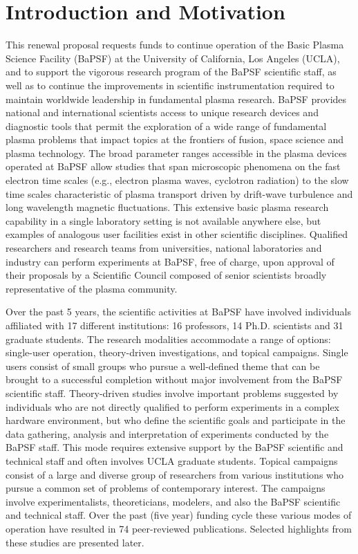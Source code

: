 \documentclass[11pt]{article}
\date{}
\title{}
\begin{document}
\section{Introduction and Motivation}

This renewal proposal requests funds to continue operation of the Basic
Plasma Science Facility (BaPSF) at the University of California, Los
Angeles (UCLA), and to support the vigorous research program of the
BaPSF scientific staff, as well as to continue the improvements in
scientific instrumentation required to maintain worldwide leadership in
fundamental plasma research.  BaPSF provides national and international scientists access to unique
research devices and diagnostic tools that permit the exploration of a
wide range of fundamental plasma problems that impact topics at the
frontiers of fusion, space science and plasma technology. The broad
parameter ranges accessible in the plasma devices operated at BaPSF
allow studies that span microscopic phenomena on the fast electron time
scales (e.g., electron plasma waves, cyclotron radiation) to the slow
time scales characteristic of plasma transport driven by drift-wave
turbulence and long wavelength magnetic fluctuations. This extensive
basic plasma research capability in a single laboratory setting is not
available anywhere else, but examples of analogous user facilities exist
in other scientific disciplines. Qualified researchers and research
teams from universities, national laboratories and industry can perform
experiments at BaPSF, free of charge, upon approval of their proposals
by a Scientific Council composed of senior scientists broadly
representative of the plasma community.

Over the past 5 years, the scientific activities at BaPSF have involved
individuals affiliated with 17 different institutions: 16 professors,
14 Ph.D. scientists and 31 graduate students.  The research modalities
accommodate a range of options: single-user operation, theory-driven
investigations, and topical campaigns. Single users consist of small
groups who pursue a well-defined theme that can be brought to a
successful completion without major involvement from the BaPSF
scientific staff. Theory-driven studies involve important problems
suggested by individuals who are not directly qualified to perform
experiments in a complex hardware environment, but who define the
scientific goals and participate in the data gathering, analysis and
interpretation of experiments conducted by the BaPSF staff. This mode
requires extensive support by the BaPSF scientific and technical staff
and often involves UCLA graduate students. Topical campaigns consist
of a large and diverse group of researchers from various institutions
who pursue a common set of problems of contemporary interest. The
campaigns involve experimentalists, theoreticians, modelers, and also
the BaPSF scientific and technical staff. Over the past (five year)
funding cycle these various modes of operation have resulted in 74
peer-reviewed publications.
Selected highlights from these studies are presented later.
\end{document}
